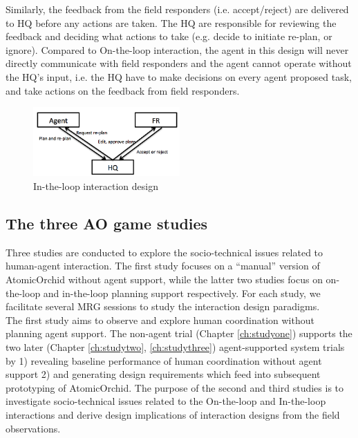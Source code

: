 Similarly, the feedback from the field responders (i.e. accept/reject) are delivered to HQ before any actions are taken. The HQ are responsible for reviewing the feedback and deciding what actions to take (e.g. decide to initiate re-plan, or ignore). Compared to On-the-loop interaction, the agent in this design will never directly communicate with field responders and the agent cannot operate without the HQ's input, i.e. the HQ have to make decisions on every agent proposed task, and take actions on the feedback from field responders. \\

\begin{figure}[h]
  \centering
  \includegraphics[width=0.5\textwidth]{img/approach/InTheLoop}
  \caption{In-the-loop interaction design}
  \label{fig:InTheLoop}
\end{figure}


\subsection{The three AO game studies}
Three studies are conducted to explore the socio-technical issues related to human-agent interaction. The first study focuses on a ``manual'' version of AtomicOrchid without agent support, while the latter two studies focus on on-the-loop and in-the-loop planning support respectively. For each study, we facilitate several \acf{MRG} sessions to study the interaction design paradigms. \\ 

The first study aims to observe and explore human coordination without planning agent support. The non-agent trial (Chapter \ref{ch:studyone}) supports the two later (Chapter \ref{ch:studytwo}, \ref{ch:studythree}) agent-supported system trials by 1) revealing baseline performance of human coordination without agent support 2) and generating design requirements which feed into subsequent prototyping of AtomicOrchid. The purpose of the second and third studies is to investigate socio-technical issues related to the On-the-loop and In-the-loop interactions and derive design implications of interaction designs from the field observations.\\

